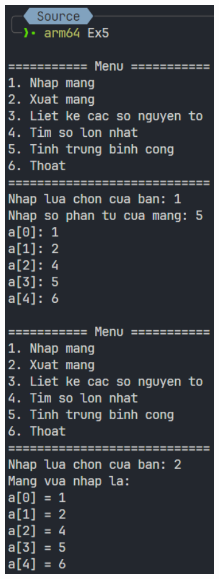 \documentclass[a4paper,12pt]{report}
\begin{document}
\begin{figure}[!ht]
	\centering
	\begin{subfigure}{0.28\textwidth}
		\centering
		\includegraphics[width=1\textwidth]{imgs/5_1.png}

\end{subfigure}
\end{figure}
\end{document}

